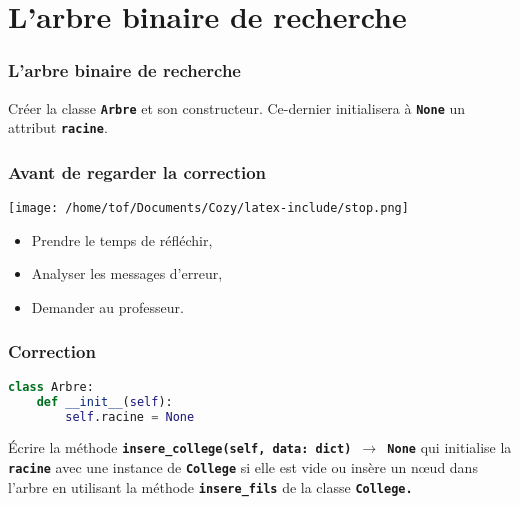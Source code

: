 \documentclass[svgnames,11pt]{beamer}
\begin{document}
\section{L'arbre binaire de recherche}
\begin{frame}
    \frametitle{L'arbre binaire de recherche}

\begin{activite}
Créer la classe \textbf{\texttt{Arbre}} et son constructeur. Ce-dernier initialisera à \textbf{\texttt{None}} un attribut \textbf{\texttt{racine}}.
\end{activite}

\end{frame}
\begin{frame}
    \frametitle{Avant de regarder la correction}
\begin{center}
    \centering
    \texttt{[image: /home/tof/Documents/Cozy/latex-include/stop.png]}
    \end{center}
{\Large
    \begin{itemize}
        \item Prendre le temps de réfléchir,
        \item Analyser les messages d'erreur,
        \item Demander au professeur.
    \end{itemize}
}
\end{frame}
\begin{frame}[fragile]
    \frametitle{Correction}

\begin{center}
\begin{lstlisting}[language=Python , basicstyle=\ttfamily\small, xleftmargin=2em, xrightmargin=2em]
class Arbre:
    def __init__(self):
        self.racine = None
\end{lstlisting}
\end{center}   

\end{frame}
\begin{frame}

\begin{activite}
Écrire la méthode \textbf{\texttt{insere\_college(self, data: dict) $\rightarrow$ None}} qui initialise la \textbf{\texttt{racine}} avec une instance de \textbf{\texttt{College}} si elle est vide ou insère un nœud dans l'arbre en utilisant la méthode \textbf{\texttt{insere\_fils}} de la classe \textbf{\texttt{College.}}
\end{activite}

\end{frame}
\end{document}
